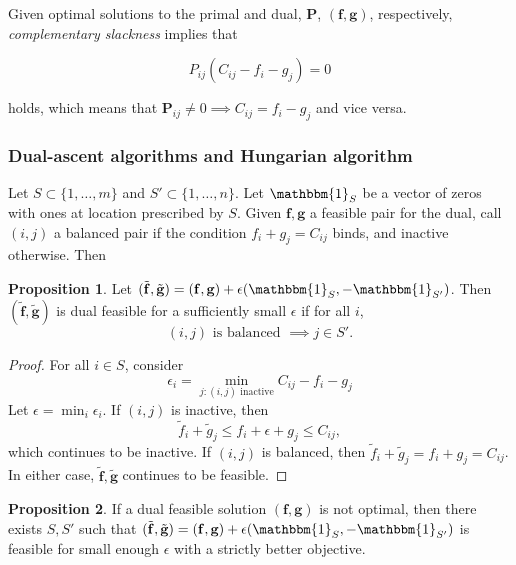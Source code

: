 \documentclass[11pt,reqno]{amsart}
\renewcommand{\b}{\mathbf}
\newcommand{\one}{\mathbbm{1}}
\theoremstyle{definition}
\newtheorem{prop}{Proposition}
\theoremstyle{remark}
\begin{document}

Given optimal solutions to the primal and dual, $\b P$, $(\b f, \b g)$,
respectively, \emph{complementary slackness} implies that

\[ P_{ij} (C_{ij} - f_i - g_j) = 0 \tag{Complementary slackness} \]

holds, which means that $\b P_{ij} \neq 0 \implies C_{ij} = f_i - g_j$ and
vice versa. 
    
\subsubsection{Dual-ascent algorithms and Hungarian algorithm}

Let $S \subset \{1,\ldots,m\}$ and $S' \subset \{1,\ldots,n\}.$ Let $\one_S$ be
a vector of zeros with ones at location prescribed by $S$. Given $\b f, \b g$ a
feasible pair for the dual, call $(i,j)$ a balanced pair if the condition $f_i +
g_j = C_{ij}$ binds, and inactive otherwise. Then 

\begin{prop}
    Let $(\tilde {\b f}, \tilde {\b g}) = (\b f, \b g) + \epsilon (\one_S,
    -\one_{S'})$. Then $(\tilde {\b f}, \tilde {\b g})$ is dual feasible for a
    sufficiently small $\epsilon$ if for all $i$,
    \[ (i,j) \text{ is balanced } \implies \text{$j \in S'$}. \]
\label{prop:feasible}
\end{prop}

\begin{proof}
    For all $i\in S$, consider
    \[ \epsilon_i = \min_{j: (i,j) \text{ inactive}} C_{ij} - f_i - g_j \]
    Let $\epsilon = \min_i \epsilon_i$. If $(i,j)$ is inactive, then
    \[ \tilde f_i + \tilde g_j \le f_i + \epsilon + g_j\le C_{ij}, \]
    which continues to be inactive. If $(i,j)$ is balanced, then $\tilde f_i +
    \tilde g_j = f_i + g_j = C_{ij}$. In either case, $\tilde {\b f}, \tilde {\b
    g}$ continues to be feasible.
\end{proof}

\begin{prop}
\label{prop:dualascent}
    If a dual feasible solution $(\b f, \b g)$ is not optimal, then there
    exists $S,S'$ such that $(\tilde {\b f}, \tilde {\b g}) = (\b f, \b g) + \epsilon (\one_S,
    -\one_{S'})$ is feasible for small enough $\epsilon$ with a strictly
    better objective.
\end{prop}
\end{document}
